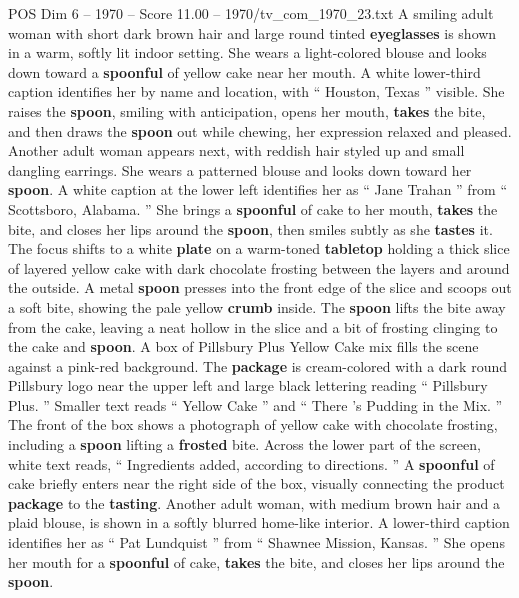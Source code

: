 \begin{textsample}{POS Dim 6 – 1970 – Score 11.00 – 1970/tv\_com\_1970\_23.txt}  \label{ex:f6_pos_043}
A smiling adult woman with short dark brown hair and large round tinted \textbf{eyeglasses} is shown in a warm, softly lit indoor setting.
She wears a light-colored blouse and looks down toward a \textbf{spoonful} of yellow cake near her mouth.
A white lower-third caption identifies her by name and location, with “ Houston, Texas ” visible.
She raises the \textbf{spoon}, smiling with anticipation, opens her mouth, \textbf{takes} the bite, and then draws the \textbf{spoon} out while chewing, her expression relaxed and pleased.
Another adult woman appears next, with reddish hair styled up and small dangling earrings.
She wears a patterned blouse and looks down toward her \textbf{spoon}.
A white caption at the lower left identifies her as “ Jane Trahan ” from “ Scottsboro, Alabama. ” She brings a \textbf{spoonful} of cake to her mouth, \textbf{takes} the bite, and closes her lips around the \textbf{spoon}, then smiles subtly as she \textbf{tastes} it.
The focus shifts to a white \textbf{plate} on a warm-toned \textbf{tabletop} holding a thick slice of layered yellow cake with dark chocolate frosting between the layers and around the outside.
A metal \textbf{spoon} presses into the front edge of the slice and scoops out a soft bite, showing the pale yellow \textbf{crumb} inside.
The \textbf{spoon} lifts the bite away from the cake, leaving a neat hollow in the slice and a bit of frosting clinging to the cake and \textbf{spoon}.
A box of Pillsbury Plus Yellow Cake mix fills the scene against a pink-red background.
The \textbf{package} is cream-colored with a dark round Pillsbury logo near the upper left and large black lettering reading “ Pillsbury Plus. ” Smaller text reads “ Yellow Cake ” and “ There ’s Pudding in the Mix. ” The front of the box shows a photograph of yellow cake with chocolate frosting, including a \textbf{spoon} lifting a \textbf{frosted} bite.
Across the lower part of the screen, white text reads, “ Ingredients added, according to directions. ” A \textbf{spoonful} of cake briefly enters near the right side of the box, visually connecting the product \textbf{package} to the \textbf{tasting}.
Another adult woman, with medium brown hair and a plaid blouse, is shown in a softly blurred home-like interior.
A lower-third caption identifies her as “ Pat Lundquist ” from “ Shawnee Mission, Kansas. ” She opens her mouth for a \textbf{spoonful} of cake, \textbf{takes} the bite, and closes her lips around the \textbf{spoon}.

\end{textsample}
